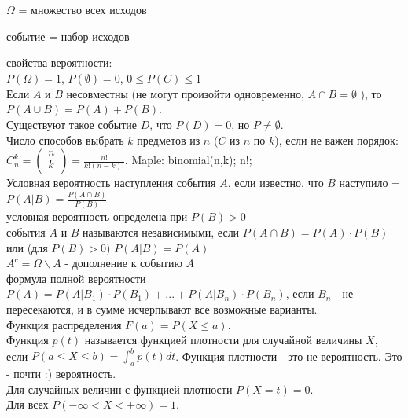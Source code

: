 
$\displaystyle \Omega $  = множество всех исходов

событие = набор исходов

свойства вероятности:  \\
$P(\Omega)=1$, $P(\emptyset)=0$,  $0\le P(C)\le 1$ \\
Если  $A$  и  $B$  несовместны (не могут произойти одновременно,
$A\cap B=\emptyset $ ), то  $P(A\cup B)=P(A)+P(B)$. \\

Существуют такое событие $D$, что $P(D)=0$, но $P\ne\emptyset$. \\

Число способов выбрать  $k$  предметов из $n$ ($C$ из  $n$  по
$k$), если не важен порядок: $C_{n}^{k} = (
\begin{array}{c}
  n \\
  k \\
\end{array}
) =\frac{n!}{k!(n-k)!}$. Maple: binomial(n,k); n!; \\


Условная вероятность наступления события  $A$, если известно, что
$B$ наступило =  $P(A|B)=\frac{P(A\cap B)}{P(B)} $ \\
условная вероятность определена при  $P(B)>0$ \\

события  $A$  и  $B$  называются независимыми, если  $P(A\cap
B)=P(A)\cdot P(B)$ или (для $P(B)>0$) $P(A|B)=P(A)$ \\


$A^{c} =\Omega \backslash A$  - дополнение к событию  $A$ \\

формула полной вероятности  $P(A)=P(A|B_{1} )\cdot P(B_{1}
)+...+P(A|B_{n} )\cdot P(B_{n} )$, если $B_{n} $  - не
пересекаются, и в сумме исчерпывают все возможные варианты. \\

Функция распределения  $F(a)=P(X\le a)$. \\

Функция  $p(t)$  называется функцией плотности для случайной
величины  $X$, если  $P(a\le X\le b)=\int _{a}^{b}p(t)dt $.
Функция плотности - это не вероятность. Это - почти :)
вероятность. \\

Для случайных величин с функцией плотности  $P(X=t)=0$. \\
Для всех $P(-\infty <X<+\infty )=1$. \\

